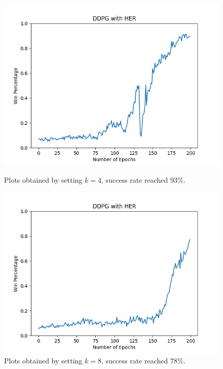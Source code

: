 \documentclass[a4paper]{report}
\begin{document}
\begin{figure}[h!]
\begin{minipage}[b]{0.47\textwidth}
\centering
\includegraphics[width=\textwidth]{k4.png}
\caption{\label{k4}Plots obtained by setting $k=4$, success rate reached 93\%.}
\end{minipage}
\hfill
\begin{minipage}[b]{0.47\textwidth}
\centering
\includegraphics[width=\textwidth]{k8.png}
\caption{\label{k8}Plots obtained by setting $k=8$, success rate reached 78\%.}
\end{minipage}
\hfill
\begin{minipage}[b]{0.47\textwidth}
\centering

\end{minipage}
\end{figure}
\end{document}
